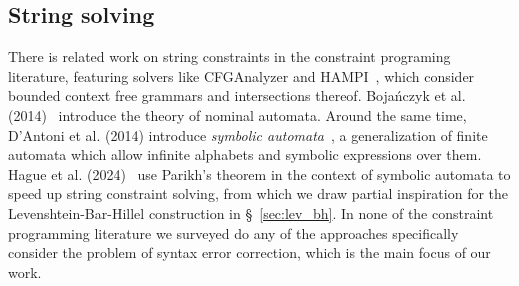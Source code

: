 \documentclass[sigplan,review,acmsmall,nonacm,anonymous]{acmart}\settopmatter{printfolios=false,printccs=false,printacmref=false}
\begin{document}

%

  \subsection{String solving}

  There is related work on string constraints in the constraint programing literature, featuring solvers like CFGAnalyzer and HAMPI~\cite{kiezun2009hampi}, which consider bounded context free grammars and intersections thereof. Boja{\'n}czyk et al. (2014)~\cite{bojanczyk2014automata} introduce the theory of nominal automata. Around the same time, D'Antoni et al. (2014) introduce \textit{symbolic automata}~\cite{dantoni2014minimization}, a generalization of finite automata which allow infinite alphabets and symbolic expressions over them. Hague et al. (2024)~\cite{hague2024parikh} use Parikh's theorem in the context of symbolic automata to speed up string constraint solving, from which we draw partial inspiration for the Levenshtein-Bar-Hillel construction in \S~\ref{sec:lev_bh}. In none of the constraint programming literature we surveyed do any of the approaches specifically consider the problem of syntax error correction, which is the main focus of our work.
\end{document}
